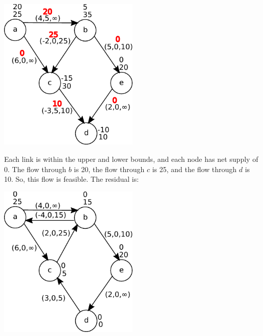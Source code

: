 \documentclass[fleqn]{homework}
\begin{document}
\begin{problem}{1}
\begin{enumerate}[a.]
      \includegraphics[width=0.5\textwidth]{problem1-partb.pdf}

      Each link is within the upper and lower bounds, and each node has net
      supply of 0.  The flow through $b$ is 20, the flow through $c$ is 25, and
      the flow through $d$ is 10.  So, this flow is feasible.  The residual is:

      \includegraphics[width=0.5\textwidth]{problem1-partb-resid.pdf}
    \end{enumerate}

    
  \end{problem}
\end{document}
